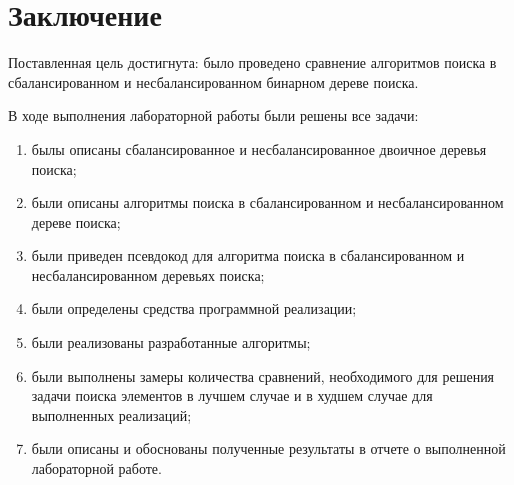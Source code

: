 \chapter*{Заключение}

Поставленная цель достигнута: было проведено сравнение алгоритмов поиска в сбалансированном и несбалансированном бинарном дереве поиска.

В ходе выполнения лабораторной работы были решены все задачи:

\begin{enumerate}
	\item былы описаны сбалансированное и несбалансированное двоичное деревья поиска;
	\item были описаны алгоритмы поиска в сбалансированном и несбалансированном дереве поиска;
	\item были приведен псевдокод для алгоритма поиска в сбалансированном и несбалансированном деревьях поиска;
	\item были определены средства программной реализации;
	\item были реализованы разработанные алгоритмы;
	\item были выполнены замеры количества сравнений, необходимого для решения задачи поиска элементов в лучшем случае и в худшем случае для выполненных реализаций;
	\item были описаны и обоснованы полученные результаты в отчете о выполненной лабораторной работе.
\end{enumerate}

